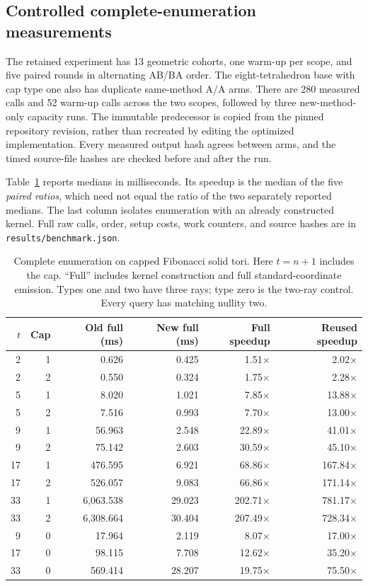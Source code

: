 \subsection{Controlled complete-enumeration measurements}

The retained experiment has 13 geometric cohorts, one warm-up per scope,
and five paired rounds in alternating AB/BA order. The eight-tetrahedron
base with cap type one also has duplicate same-method A/A arms. There are
280 measured calls and 52 warm-up calls across the two scopes, followed by
three new-method-only capacity runs. The immutable predecessor is copied
from the pinned repository revision, rather than recreated by editing the
optimized implementation. Every measured output hash agrees between arms,
and the timed source-file hashes are checked before and after the run.

Table~\ref{tab:enumeration} reports medians in milliseconds. Its speedup is
the median of the five \emph{paired ratios}, which need not equal the ratio
of the two separately reported medians. The last column isolates enumeration
with an already constructed kernel. Full raw calls, order, setup costs,
work counters, and source hashes are in \texttt{results/benchmark.json}.

\begin{table}[htbp]
\centering\small
\begin{tabular}{@{}rrrrrr@{}}
\toprule
$t$ & Cap & Old full (ms) & New full (ms) & Full speedup & Reused speedup\\
\midrule
2 & 1 & 0.626 & 0.425 & 1.51$\times$ & 2.02$\times$\\
2 & 2 & 0.550 & 0.324 & 1.75$\times$ & 2.28$\times$\\
5 & 1 & 8.020 & 1.021 & 7.85$\times$ & 13.88$\times$\\
5 & 2 & 7.516 & 0.993 & 7.70$\times$ & 13.00$\times$\\
9 & 1 & 56.963 & 2.548 & 22.89$\times$ & 41.01$\times$\\
9 & 2 & 75.142 & 2.603 & 30.59$\times$ & 45.10$\times$\\
17 & 1 & 476.595 & 6.921 & 68.86$\times$ & 167.84$\times$\\
17 & 2 & 526.057 & 9.083 & 66.86$\times$ & 171.14$\times$\\
33 & 1 & 6,063.538 & 29.023 & 202.71$\times$ & 781.17$\times$\\
33 & 2 & 6,308.664 & 30.404 & 207.49$\times$ & 728.34$\times$\\
\midrule
9 & 0 & 17.964 & 2.119 & 8.07$\times$ & 17.00$\times$\\
17 & 0 & 98.115 & 7.708 & 12.62$\times$ & 35.20$\times$\\
33 & 0 & 569.414 & 28.207 & 19.75$\times$ & 75.50$\times$\\
\bottomrule
\end{tabular}
\caption{Complete enumeration on capped Fibonacci solid tori. Here
$t=n+1$ includes the cap. ``Full'' includes kernel construction and full
standard-coordinate emission. Types one and two have three rays; type zero
is the two-ray control. Every query has matching nullity two.}
\label{tab:enumeration}
\end{table}

